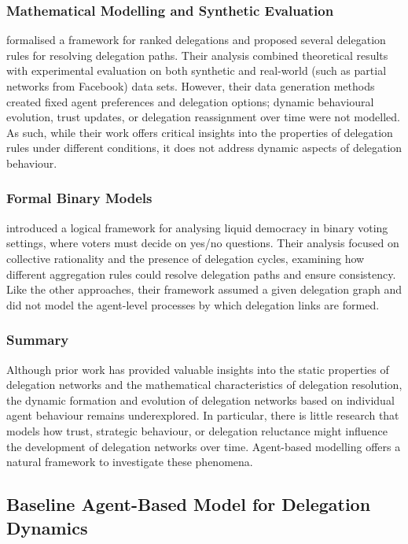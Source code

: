 \subsubsection{Mathematical Modelling and Synthetic Evaluation}

\citet{brill_liquid_2021} formalised a framework for ranked delegations and proposed several delegation rules for resolving delegation paths. Their analysis combined theoretical results with experimental evaluation on both synthetic and real-world (such as partial networks from Facebook) data sets. However, their data generation methods created fixed agent preferences and delegation options; dynamic behavioural evolution, trust updates, or delegation reassignment over time were not modelled. As such, while their work offers critical insights into the properties of delegation rules under different conditions, it does not address dynamic aspects of delegation behaviour.

\subsubsection{Formal Binary Models}

\citet{christoffBinaryVotingDelegable2017} introduced a logical framework for analysing liquid democracy in binary voting settings, where voters must decide on yes/no questions. Their analysis focused on collective rationality and the presence of delegation cycles, examining how different aggregation rules could resolve delegation paths and ensure consistency. Like the other approaches, their framework assumed a given delegation graph and did not model the agent-level processes by which delegation links are formed.

\subsubsection{Summary}

Although prior work has provided valuable insights into the static properties of delegation networks and the mathematical characteristics of delegation resolution, the dynamic formation and evolution of delegation networks based on individual agent behaviour remains underexplored. In particular, there is little research that models how trust, strategic behaviour, or delegation reluctance might influence the development of delegation networks over time. Agent-based modelling offers a natural framework to investigate these phenomena.

\subsection{Baseline Agent-Based Model for Delegation Dynamics}

